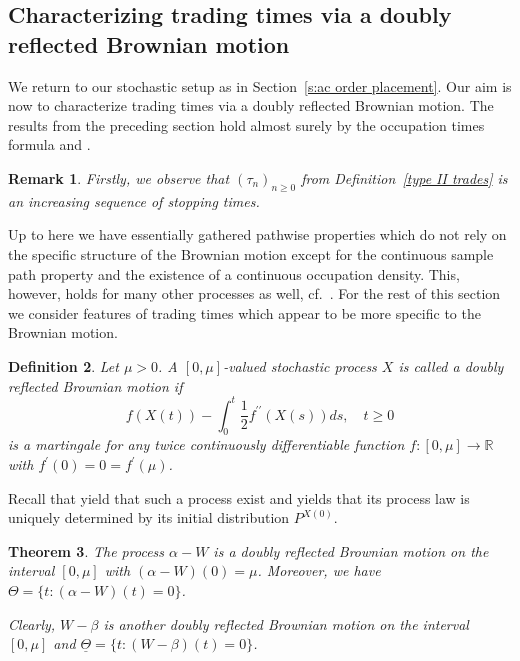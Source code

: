 \documentclass[11pt]{scrartcl}
\newtheorem{theorem}{Theorem}
\newtheorem{definition}[theorem]{Definition}
\newtheorem{remark}[theorem]{Remark}
\begin{document}
\subsection{Characterizing trading times via a doubly reflected Brownian
motion}
We return to our stochastic setup as in Section~\ref{s:ac order placement}.
Our aim is now to characterize trading times via a doubly reflected Brownian
motion. The results from the preceding section hold almost surely
by the occupation times formula \cite[Theorem VI.1.6]{RY} and \cite[Theorem VI.1.7]{RY}.

%
\begin{remark}
\label{r: tau stopping times} Firstly, we observe that $(\tau_n)_{n\geq 0}$ from Definition~\ref{type II trades}
is an increasing sequence of stopping times.
\end{remark}


Up to here we have essentially gathered pathwise properties which do not
rely on the specific structure of the Brownian motion except for the
continuous sample path property and the existence of a continuous occupation
density. This, however, holds for many other processes as well, cf.\ \cite[Theorem IV.76, Corollary IV.2]{protter.04}. For the rest of this section we
consider features of trading times which appear to be more specific to the
Brownian motion.

\begin{definition}
\label{d:DRBM} Let $\mu>0$. A $[0,\mu]$-valued stochastic process $X$ is
called a \emph{doubly reflected Brownian motion} if 
\begin{equation*}
f(X(t)) - \int_0^t \frac{1}{2}f^{\prime \prime }(X(s)) ds,\quad t\geq 0
\end{equation*}
is a martingale for any twice continuously differentiable function $f:[0,\mu]\rightarrow\mathbb{R}$ with $f^{\prime }(0)=0=f^{\prime }(\mu)$.
\end{definition}

Recall that \cite[Theorems 8.1.1, 4.5.4]{ethier.kurtz.86} yield that such a
process exist and \cite[Theorem 4.4.1]{ethier.kurtz.86} yields that its
process law is uniquely determined by its initial distribution $P^{X(0)}$.

\begin{theorem}
\label{doubly reflected BM}The process $\alpha-W$ is a doubly reflected
Brownian motion on the interval $[0,\mu]$ with $(\alpha-W)(0)=\mu$.
Moreover, we have $\Theta=\{t:(\alpha-W)(t)=0\}$.

Clearly, $W-\beta $ is another doubly reflected Brownian motion on the
interval $[0,\mu ]$ and $\underline{\Theta }=\{t:(W-\beta )(t)=0\}$. 
\end{theorem}
\end{document}
